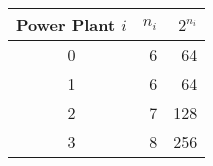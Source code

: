 \begin{tabular}{| c | r | r |}
  \hline
  Power Plant $i$ & $n_i$ & $2^{n_i}$ \\
  \hline \hline
  0 & 6 & 64 \\
  \hline
  1 & 6 & 64 \\
  \hline
  2 & 7 & 128 \\
  \hline
  3 & 8 & 256 \\
  \hline
\end{tabular}